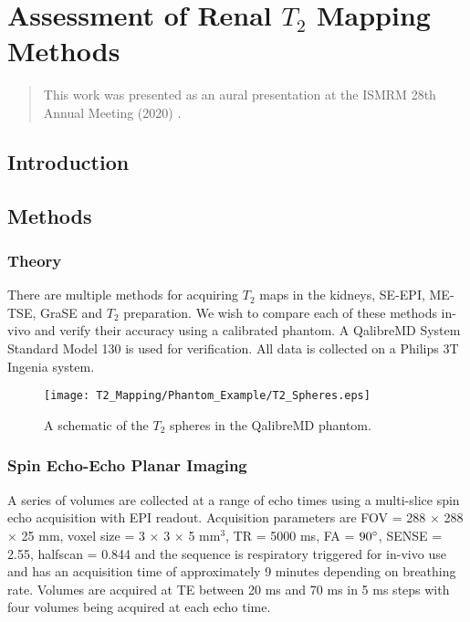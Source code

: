 \chapter{Assessment of Renal $T_2$ Mapping Methods}
\label{chap:t2_mapping}

\begin{abstract}
	This work was presented as an aural presentation at the \ac{ISMRM} 28th Annual Meeting (2020) \cite{daniel_comparison_2020}.\\
	
	\lipsum[1]
\end{abstract}
\newpage

\section{Introduction}
\label{sec:t2_intro}



\section{Methods}
\label{sec:t2_methods}

\subsection{Theory}

There are multiple methods for acquiring $T_2$ maps in the kidneys, \ac{SE}-\ac{EPI}, \ac{ME-TSE}, \ac{GraSE} and $T_2$ preparation. We wish to compare each of these methods in-vivo and verify their accuracy using a calibrated phantom. A QalibreMD System Standard Model 130 \cite{noauthor_system_nodate} is used for verification. All data is collected on a Philips 3T Ingenia system. 

\begin{figure}[H]
	\centering
	\texttt{[image: T2\_Mapping/Phantom\_Example/T2\_Spheres.eps]}
	\caption{A schematic of the $T_2$ spheres in the QalibreMD phantom.}
	\label{fig:t2_phantom_schematic}	
\end{figure}

\subsection{Spin Echo-Echo Planar Imaging}
A series of volumes are collected at a range of echo times using a multi-slice spin echo acquisition with \ac{EPI} readout. Acquisition parameters are \ac{FOV} = 288 $\times$ 288 $\times$ 25 mm, voxel size = 3 $\times$ 3 $\times$ 5 mm$^3$, \ac{TR} = 5000 ms, \ac{FA} = $90\degree$, \ac{SENSE} = 2.55, halfscan = 0.844 and the sequence is respiratory triggered for in-vivo use and has an acquisition time of approximately 9 minutes depending on breathing rate. Volumes are acquired at \ac{TE} between 20 ms and 70 ms in 5 ms steps with four volumes being acquired at each echo time. 


